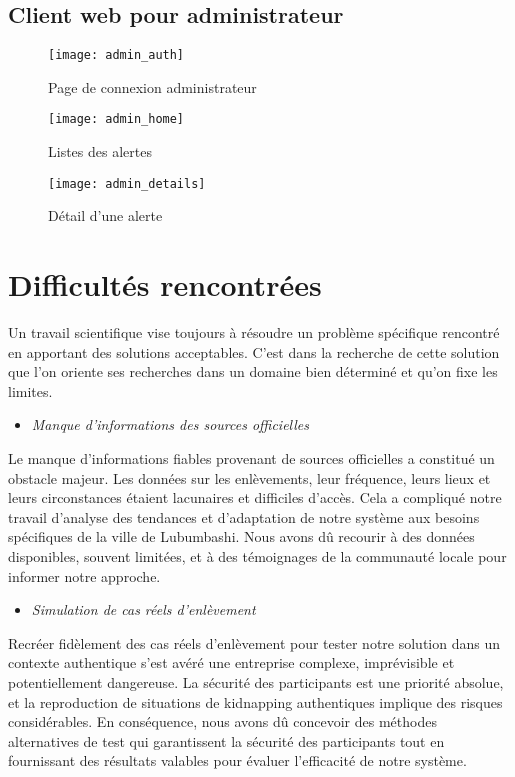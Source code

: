 \subsection{Client web pour administrateur}

\begin{figure}[H]
	\centering
	\texttt{[image: admin\_auth]}
	\caption{Page de connexion administrateur}
\end{figure}

\begin{figure}[H]
	\centering
	\texttt{[image: admin\_home]}
	\caption{Listes des alertes}
\end{figure}

\begin{figure}[H]
	\centering
	\texttt{[image: admin\_details]}
	\caption{Détail d’une alerte}
\end{figure}

\section{Difficultés rencontrées}
Un travail scientifique vise toujours à résoudre un problème spécifique rencontré en apportant des solutions acceptables. C’est dans la recherche de cette solution que l’on oriente ses recherches dans un domaine bien déterminé et qu’on fixe les limites.

\begin{itemize}
	\item \textit{Manque d'informations des sources officielles }
\end{itemize}

Le manque d'informations fiables provenant de sources officielles a constitué un obstacle majeur. Les données sur les enlèvements, leur fréquence, leurs lieux et leurs circonstances étaient lacunaires et difficiles d'accès. Cela a compliqué notre travail d'analyse des tendances et d'adaptation de notre système aux besoins spécifiques de la ville de Lubumbashi. Nous avons dû recourir à des données disponibles, souvent limitées, et à des témoignages de la communauté locale pour informer notre approche.

\begin{itemize}
	\item \textit{Simulation de cas réels d’enlèvement}
\end{itemize}

Recréer fidèlement des cas réels d'enlèvement pour tester notre solution dans un contexte authentique s'est avéré une entreprise complexe, imprévisible et potentiellement dangereuse. La sécurité des participants est une priorité absolue, et la reproduction de situations de kidnapping authentiques implique des risques considérables. En conséquence, nous avons dû concevoir des méthodes alternatives de test qui garantissent la sécurité des participants tout en fournissant des résultats valables pour évaluer l'efficacité de notre système.\\

